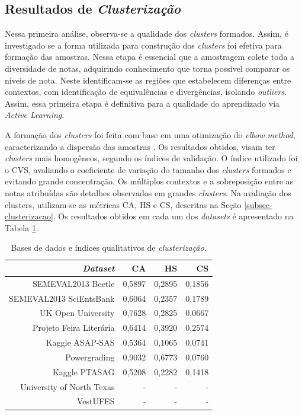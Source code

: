 \subsection{Resultados de \textit{Clusterização}}
\label{sec-res-clustering}

Nessa primeira análise, observa-se a qualidade dos \textit{clusters} formados. Assim, é investigado se a forma utilizada para construção dos \textit{clusters} foi efetiva para formação das amostras. Nessa etapa é essencial que a amostragem colete toda a diversidade de notas, adquirindo conhecimento que torna possível comparar os níveis de nota. Neste identificam-se as regiões que estabelecem diferenças entre contextos, com identificação de equivalências e divergências, isolando \textit{outliers}. Assim, essa primeira etapa é definitiva para a qualidade do aprendizado via \textit{Active Learning}.

A formação dos \textit{clusters} foi feita com base em uma otimização do \textit{elbow method}, caracterizando a dispersão das amostras \cite{spalenza2019}. Os resultados obtidos, visam ter \textit{clusters} mais homogêneos, segundo os índices de validação. O índice utilizado foi o CVS, avaliando o coeficiente de variação do tamanho dos \textit{clusters} formados e evitando grande concentração. Os múltiplos contextos e a sobreposição entre as notas atribuídas são detalhes observados em grandes \textit{clusters}. Na avaliação dos clusters, utilizam-se as métricas CA, HS e CS, descritas na Seção \ref{subsec-clusterizacao}. Os resultados obtidos em cada um dos \textit{datasets} é apresentado na Tabela \ref{tab-clstr-index}.

\begin{table}[!h]
\centering
\caption{Bases de dados e índices qualitativos de \textit{clusterização}.}
\label{tab-clstr-index}
\begin{tabular}{r | r r r }
\hline
    \textit{Dataset}  & CA & HS & CS \\ \hline 
    SEMEVAL2013 Beetle & 0,5897 & 0,2895 & 0,1856 \\
    SEMEVAL2013 SciEntsBank & 0,6064 & 0,2357 & 0,1789 \\
    UK Open University  & 0,7628 & 0,2825 & 0,0667 \\
    Projeto Feira Liter{\'a}ria & 0,6414 & 0,3920 & 0,2574 \\
    Kaggle ASAP-SAS  & 0,5364 & 0,1065 & 0,0741 \\
    Powergrading & 0,9032 & 0,6773 & 0,0760 \\
    Kaggle PTASAG  & 0,5208 & 0,2282 & 0,1418 \\
    University of North Texas & - & - & - \\
    VestUFES & - & - & - \\
\hline
\hline
\end{tabular}
\end{table}

